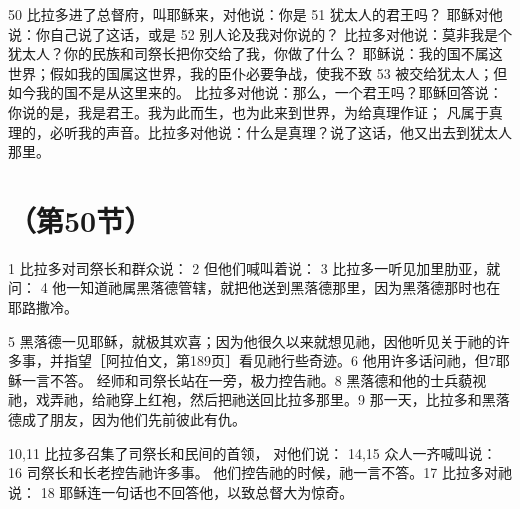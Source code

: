 50  比拉多进了总督府，叫耶稣来，对他说：你是 51 犹太人的君王吗？ 耶稣对他说：你自己说了这话，或是 52 别人论及我对你说的？ 比拉多对他说：莫非我是个犹太人？你的民族和司祭长把你交给了我，你做了什么？ 耶稣说：我的国不属这世界；假如我的国属这世界，我的臣仆必要争战，使我不致 53 被交给犹太人；但如今我的国不是从这里来的。 比拉多对他说：那么，一个君王吗？耶稣回答说：你说的是，我是君王。我为此而生，也为此来到世界，为给真理作证； 凡属于真理的，必听我的声音。比拉多对他说：什么是真理？说了这话，他又出去到犹太人那里。\par



\section{（第50节）}

1  比拉多对司祭长和群众说： 2  但他们喊叫着说： 3  比拉多一听见加里肋亚，就问： 4  他一知道祂属黑落德管辖，就把他送到黑落德那里，因为黑落德那时也在耶路撒冷。\par

5  黑落德一见耶稣，就极其欢喜；因为他很久以来就想见祂，因他听见关于祂的许多事，并指望［阿拉伯文，第189页］看见祂行些奇迹。6  他用许多话问祂，但7耶稣一言不答。 经师和司祭长站在一旁，极力控告祂。8  黑落德和他的士兵藐视祂，戏弄祂，给祂穿上红袍，然后把祂送回比拉多那里。9  那一天，比拉多和黑落德成了朋友，因为他们先前彼此有仇。\par

10,11  比拉多召集了司祭长和民间的首领， 对他们说： 14,15  众人一齐喊叫说：  16 司祭长和长老控告祂许多事。 他们控告祂的时候，祂一言不答。17  比拉多对祂说： 18  耶稣连一句话也不回答他，以致总督大为惊奇。\par

